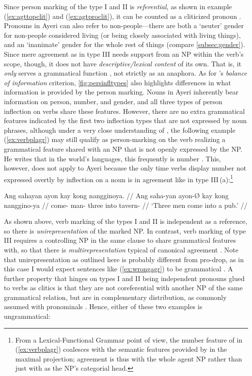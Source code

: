 Since person marking of the type I and II is \emph{referential}, as shown 
in example (\ref{ex:agttopclit}) and (\ref{ex:agtproclit}), it can be counted as 
a cliticized pronoun \citep[103]{corbett2006}. Pronouns in Ayeri can also refer 
to non-people---there are both a `neuter' gender for non-people considered 
living (or being closely associated with living things), and an `inanimate' 
gender for the whole rest of things (compare \autoref{subsec:gender}). Since 
mere agreement as in type III needs support from an NP within the verb's scope, 
though, it does not have \emph{descriptive/lexical content} of its own. That 
is, it \emph{only} serves a grammatical function \citep[104]{corbett2006}, not 
strictly as an anaphora. As for \citeauthor{corbett2006}'s \emph{balance of 
information} criterion, \autoref{fig:persinfltypes} also highlights differences 
in what information is provided by the person marking. Nouns in Ayeri 
inherently bear information on person, number, and gender, and all three types 
of person inflection on verbs share these features. However, there are no extra 
grammatical features indicated by the first two inflection types that are not 
expressed by noun phrases, although under a very close understanding of 
\citeauthor{corbett2006}, the following example (\ref{ex:verbplagr}) may still 
qualify as person-marking on the verb realizing a grammatical feature shared 
with an NP that is not openly expressed by the NP. He writes that in the 
world's languages, this frequently is number \citep[105]{corbett2006}. This, 
however, does not apply to Ayeri because the only time verbs display 
number not expressed overtly by inflection on a noun is in agreement like in 
type III\,(a):\footnote{From a Lexical-Functional Grammar point of view, the 
number feature of  in (\ref{ex:verbplagr}) coalesces with the 
semantic features provided by  in the maximal projection; 
agreement is thus with the whole agent NP rather than just with 
 as the NP's categorial head.}

\ex\label{ex:verbplagr} %
\begingl
	\gla Ang sahayan ayon kay kong nangginoya. //
	\glb Ang saha-yan ayon-Ø kay kong nanggino-ya //
	\glc \AgtT{} come-\TplM{} man-\Top{} three into tavern-\Loc{} //
	\glft `Three men come into a pub.' //
\endgl\xe

As shown above, verb marking of the types I and II is independent as a 
reference, so there is \emph{unirepresentation} of the marked NP. In contrast, 
verb marking of type III requires a controlling NP in the same clause to share 
grammatical features with, so that there is \emph{multirepresentation} typical 
of canonical agreement \citep[106]{corbett2006}. Note that unirepresentation as 
outlined here is probably different from pro-drop, as in this case I would 
expect sentences like (\ref{ex:wrongagr}) to be grammatical 
\citep[107]{corbett2006}. A further property that hinges on types I and II being 
independent pronouns glued to verbs as clitics is that they are not 
coreferential with another NP of the same grammatical relation, but are in 
complementary distribution, as commonly assumed with pronominals 
\citep[108]{corbett2006}. Hence, either of these two examples is ungrammatical:


